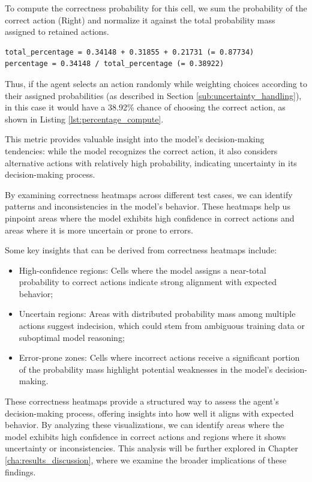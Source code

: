 To compute the correctness probability for this cell, we sum the probability of
the correct action (Right) and normalize it against the total probability mass
assigned to retained actions.

\vspace{5mm}
\begin{codewindow}
  [Text] 
  \begin{lstlisting}
total_percentage = 0.34148 + 0.31855 + 0.21731 (= 0.87734)
percentage = 0.34148 / total_percentage (= 0.38922)
\end{lstlisting}
\end{codewindow}
\vspace{5mm}

Thus, if the agent selects an action randomly while weighting choices according
to their assigned probabilities (as described in Section \ref{sub:uncertainty_handling}),
in this case it would have a 38.92\% chance of choosing the correct action, as shown
in Listing \ref{lst:percentage_compute}.

This metric provides valuable insight into the model's decision-making tendencies:
while the model recognizes the correct action, it also considers alternative actions
with relatively high probability, indicating uncertainty in its decision-making
process.

By examining correctness heatmaps across different test cases, we can identify patterns
and inconsistencies in the model's behavior. These heatmaps help us pinpoint
areas where the model exhibits high confidence in correct actions and areas
where it is more uncertain or prone to errors.

Some key insights that can be derived from correctness heatmaps include:
\begin{itemize}
  \item High-confidence regions: Cells where the model assigns a near-total
    probability to correct actions indicate strong alignment with expected
    behavior;

  \item Uncertain regions: Areas with distributed probability mass among
    multiple actions suggest indecision, which could stem from ambiguous training
    data or suboptimal model reasoning;

  \item Error-prone zones: Cells where incorrect actions receive a significant
    portion of the probability mass highlight potential weaknesses in the model's
    decision-making.
\end{itemize}
These correctness heatmaps provide a structured way to assess the agent's decision-making
process, offering insights into how well it aligns with expected behavior. By analyzing
these visualizations, we can identify areas where the model exhibits high
confidence in correct actions and regions where it shows uncertainty or
inconsistencies. This analysis will be further explored in Chapter \ref{cha:results_discussion},
where we examine the broader implications of these findings.